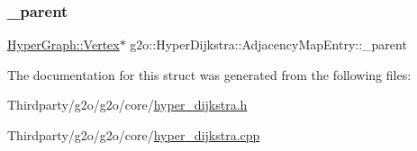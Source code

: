 \subsubsection{\texorpdfstring{\+\_\+parent}{\_parent}}
{\footnotesize\ttfamily \mbox{\hyperlink{classg2o_1_1_hyper_graph_1_1_vertex}{Hyper\+Graph\+::\+Vertex}}$\ast$ g2o\+::\+Hyper\+Dijkstra\+::\+Adjacency\+Map\+Entry\+::\+\_\+parent\hspace{0.3cm}{\ttfamily [protected]}}



The documentation for this struct was generated from the following files\+:\begin{DoxyCompactItemize}
\item 
Thirdparty/g2o/g2o/core/\mbox{\hyperlink{hyper__dijkstra_8h}{hyper\+\_\+dijkstra.\+h}}\item 
Thirdparty/g2o/g2o/core/\mbox{\hyperlink{hyper__dijkstra_8cpp}{hyper\+\_\+dijkstra.\+cpp}}\end{DoxyCompactItemize}
